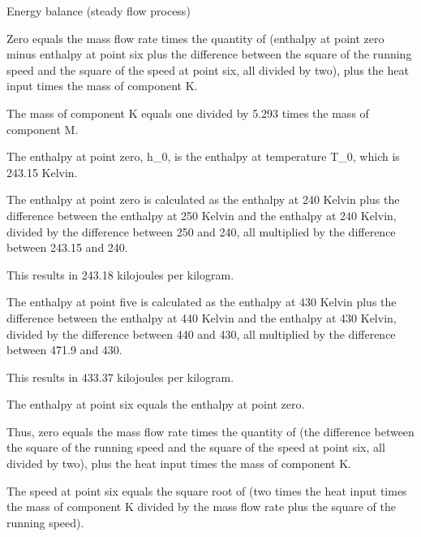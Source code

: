 Energy balance (steady flow process)

Zero equals the mass flow rate times the quantity of (enthalpy at point zero minus enthalpy at point six plus the difference between the square of the running speed and the square of the speed at point six, all divided by two), plus the heat input times the mass of component K.

The mass of component K equals one divided by 5.293 times the mass of component M.

The enthalpy at point zero, h_0, is the enthalpy at temperature T_0, which is 243.15 Kelvin.

The enthalpy at point zero is calculated as the enthalpy at 240 Kelvin plus the difference between the enthalpy at 250 Kelvin and the enthalpy at 240 Kelvin, divided by the difference between 250 and 240, all multiplied by the difference between 243.15 and 240.

This results in 243.18 kilojoules per kilogram.

The enthalpy at point five is calculated as the enthalpy at 430 Kelvin plus the difference between the enthalpy at 440 Kelvin and the enthalpy at 430 Kelvin, divided by the difference between 440 and 430, all multiplied by the difference between 471.9 and 430.

This results in 433.37 kilojoules per kilogram.

The enthalpy at point six equals the enthalpy at point zero.

Thus, zero equals the mass flow rate times the quantity of (the difference between the square of the running speed and the square of the speed at point six, all divided by two), plus the heat input times the mass of component K.

The speed at point six equals the square root of (two times the heat input times the mass of component K divided by the mass flow rate plus the square of the running speed).